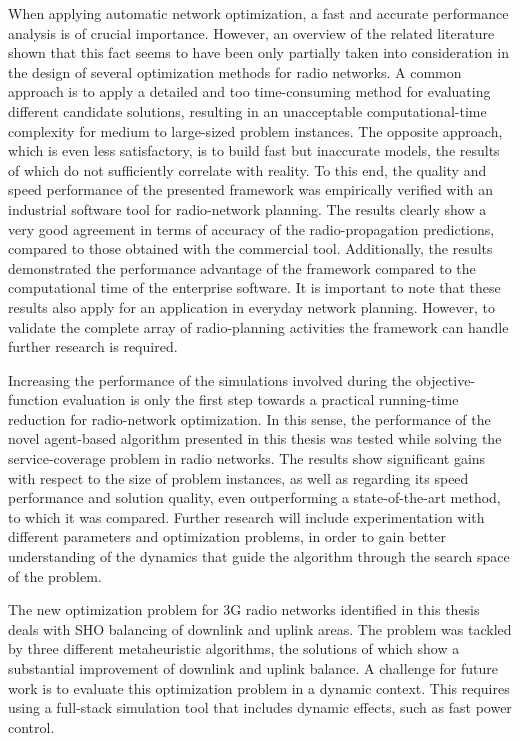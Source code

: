 When applying automatic network optimization, a fast and accurate
performance analysis is of crucial importance. However, an overview
of the related literature shown that this fact seems to have been
only partially taken into consideration in the design of several optimization
methods for radio networks. A common approach is to apply a detailed
and too time-consuming method for evaluating different candidate solutions,
resulting in an unacceptable computational-time complexity for medium
to large-sized problem instances. The opposite approach, which is
even less satisfactory, is to build fast but inaccurate models, the
results of which do not sufficiently correlate with reality. To this
end, the quality and speed performance of the presented framework
was empirically verified with an industrial software tool for radio-network
planning. The results clearly show a very good agreement in terms
of accuracy of the radio-propagation predictions, compared to those
obtained with the commercial tool. Additionally, the results demonstrated
the performance advantage of the framework compared to the computational
time of the enterprise software. It is important to note that these
results also apply for an application in everyday network planning.
However, to validate the complete array of radio-planning activities
the framework can handle further research is required.

Increasing the performance of the simulations involved during the
objective-function evaluation is only the first step towards a practical
running-time reduction for radio-network optimization. In this sense,
the performance of the novel agent-based algorithm presented in this
thesis was tested while solving the service-coverage problem in radio
networks. The results show significant gains with respect to the size
of problem instances, as well as regarding its speed performance and
solution quality, even outperforming a state-of-the-art method, to
which it was compared. Further research will include experimentation
with different parameters and optimization problems, in order to gain
better understanding of the dynamics that guide the algorithm through
the search space of the problem.

The new optimization problem for 3G radio networks identified in this
thesis deals with SHO balancing of downlink and uplink areas. The
problem was tackled by three different metaheuristic algorithms, the
solutions of which show a substantial improvement of downlink and
uplink balance. A challenge for future work is to evaluate this optimization
problem in a dynamic context. This requires using a full-stack simulation
tool that includes dynamic effects, such as fast power control.

